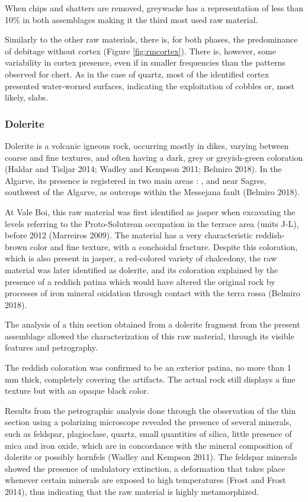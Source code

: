 \documentclass[12pt,twoside]{reedthesis}
\begin{document}
When chips and shatters are removed, greywacke has a representation of less than 10\% in both assemblages making it the third most used raw material.

Similarly to the other raw materials, there is, for both phases, the predominance of debitage without cortex (Figure \ref{fig:rmcortex}). There is, however, some variability in cortex presence, even if in smaller frequencies than the patterns observed for chert. As in the case of quartz, most of the identified cortex presented water-worned surfaces, indicating the exploitation of cobbles or, most likely, slabs.

\hypertarget{dolerite}{%
\subsubsection{Dolerite}\label{dolerite}}

Dolerite is a volcanic igneous rock, occurring mostly in dikes, varying between coarse and fine textures, and often having a dark, grey or greyish-green coloration (Haldar and Tisljar 2014; Wadley and Kempson 2011; Belmiro 2018). In the Algarve, its presence is registered in two main areas : , and near Sagres, southwest of the Algarve, as outcrops within the Messejana fault (Belmiro 2018).

At Vale Boi, this raw material was first identified as jasper when excavating the levels referring to the Proto-Solutrean occupation in the terrace area (units J-L), before 2012 (Marreiros 2009). The material has a very characteristic reddish-brown color and fine texture, with a conchoidal fracture. Despite this coloration, which is also present in jasper, a red-colored variety of chalcedony, the raw material was later identified as dolerite, and its coloration explained by the presence of a reddish patina which would have altered the original rock by processes of iron mineral oxidation through contact with the terra rossa (Belmiro 2018).

The analysis of a thin section obtained from a dolerite fragment from the present assemblage allowed the characterization of this raw material, through its visible features and petrography.

The reddish coloration was confirmed to be an exterior patina, no more than 1 mm thick, completely covering the artifacts. The actual rock still displays a fine texture but with an opaque black color.

Results from the petrographic analysis done through the observation of the thin section using a polarizing microscope revealed the presence of several minerals, such as feldspar, plagioclase, quartz, small quantities of silica, little presence of mica and iron oxide, which are in concordance with the mineral composition of dolerite or possibly hornfels (Wadley and Kempson 2011). The feldspar minerals showed the presence of undulatory extinction, a deformation that takes place whenever certain minerals are exposed to high temperatures (Frost and Frost 2014), thus indicating that the raw material is highly metamorphized.
\end{document}
